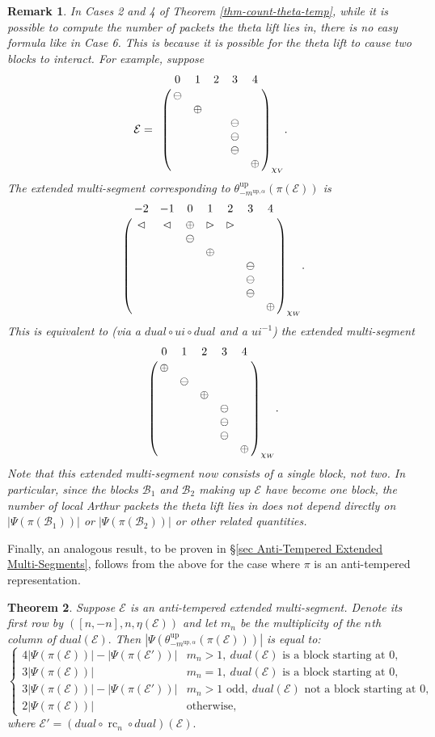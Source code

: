 \documentclass[11pt,letterpaper]{amsart}
\newcommand{\up}{{\mathrm{up}}}
\newcommand{\inv}{^{-1}}
\newcommand{\BB}{\mathcal{B}}
\newcommand{\EE}{\mathcal{E}}
\newcommand{\rc}{\operatorname{rc}}
\newtheorem{thm}{Theorem}[section]
\newtheorem{rmk}[thm]{Remark}
\numberwithin{equation}{section}
\begin{document}
\begin{rmk}\label{rmk cases 1 and 4}
    In Cases 2 and 4 of Theorem \ref{thm-count-theta-temp}, while it is possible to compute the number of packets the theta lift lies in, there is no easy formula like in Case 6. This is because it is possible for the theta lift to cause two blocks to interact. For example, suppose 
    \[\EE = \bordermatrix{
    & 0 & 1 & 2 & 3 & 4 \cr
    & \ominus & & & & \cr
    & & \oplus & & & \cr
    & & & & \ominus & \cr
    & & & & \ominus & \cr
    & & & & \ominus & \cr
    & & & & & \oplus \cr
    }_{\chi_V}.\] The extended multi-segment corresponding to $\theta_{-m^{\up, \alpha}}^\up(\pi(\EE))$ is
    \[\bordermatrix{
    & -2 & -1 & 0 & 1 & 2 & 3 & 4 \cr
    & \lhd & \lhd & \oplus & \rhd & \rhd & & \cr
    &&& \ominus & & & & \cr
    &&& & \oplus & & & \cr
    &&& & & & \ominus & \cr
    &&& & & & \ominus & \cr
    &&& & & & \ominus & \cr
    &&& & & & & \oplus \cr
    }_{\chi_W}.\] This is equivalent to (via a $dual \circ ui \circ dual$ and a $ui\inv$) the extended multi-segment
    \[\bordermatrix{
    & 0 & 1 & 2 & 3 & 4 \cr
    & \oplus & & & & \cr
    & & \ominus & & & \cr
    & & & \oplus & & \cr
    & & & & \ominus & \cr
    & & & & \ominus & \cr
    & & & & \ominus & \cr
    & & & & & \oplus \cr
    }_{\chi_W}.\] Note that this extended multi-segment now consists of a single block, not two. In particular, since the blocks $\BB_1$ and $\BB_2$ making up $\EE$ have become one block, the number of local Arthur packets the theta lift lies in does not depend directly on $|\Psi(\pi(\BB_1))|$ or $|\Psi(\pi(\BB_2))|$ or other related quantities.
\end{rmk}

Finally, an analogous result, to be proven in \S\ref{sec Anti-Tempered Extended Multi-Segments}, follows from the above for the case where $\pi$ is an anti-tempered representation.

\begin{thm}
\label{theta-antitempered-count}
    Suppose $\mathcal{E}$ is an anti-tempered extended multi-segment. Denote its first row by $([n, -n], n, \eta(\mathcal{E}))$ and let $m_n$ be the multiplicity of the $n$th column of $dual(\mathcal{E}).$ Then $|\Psi(\theta_{-m^{\up, \alpha}}^\up (\pi(\mathcal{E})))|$ is equal to:
    $$\begin{cases}
        4|\Psi(\pi(\mathcal{E}))| - |\Psi(\pi(\EE'))| & m_n > 1, ~dual(\mathcal{E}) \text{ is a block starting at $0$},\\
        3 |\Psi(\pi(\mathcal{E}))| & m_n = 1, ~dual(\mathcal{E}) \text{ is a block starting at $0$},  \\
        3|\Psi(\pi(\mathcal{E}))| - |\Psi(\pi(\EE'))| & m_n > 1 \text{ odd}, ~dual(\mathcal{E}) \text{ not a block starting at $0$},\\
        2 |\Psi(\pi(\mathcal{E}))| & \text{otherwise},
    \end{cases}$$
    where $\EE'=(dual \circ \rc_n\circ dual)(\EE).$
\end{thm}
\end{document}
